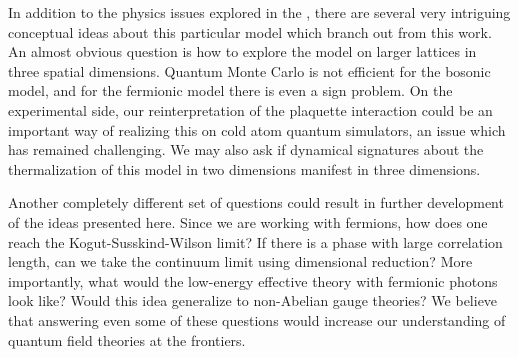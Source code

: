\documentclass[a4paper,11pt]{article}
\begin{document}
 In addition to the physics issues explored in the \cite{Flink2021}, there are several very intriguing conceptual ideas about this
 particular model which branch out from this work. An almost obvious question is how to explore the model on larger 
 lattices in three spatial dimensions. Quantum Monte Carlo is not efficient for the bosonic model, and for the 
 fermionic model there is even a sign problem. On the experimental side, our reinterpretation of the plaquette interaction 
 could be an important way of realizing this on cold atom quantum simulators, an issue which has remained challenging. We may also ask if dynamical signatures about the thermalization of this model in two dimensions manifest in three dimensions. 
 
 Another completely different set of questions could result in further development of the ideas presented here.
 Since we are working with fermions, how does one reach the Kogut-Susskind-Wilson limit? If there is a phase with
 large correlation length, can we take the continuum limit using dimensional reduction? More importantly, what
 would the low-energy effective theory with fermionic photons look like? Would this idea generalize to non-Abelian 
 gauge theories? We believe that answering even some of these questions would increase our understanding of 
 quantum field theories at the frontiers. 
 


%

\end{document}
